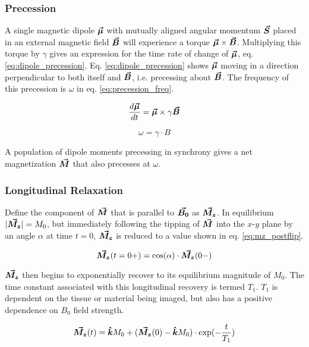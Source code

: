 \subsubsection{Precession}
A single magnetic dipole $\bm{\vec{\mu}}$ with mutually aligned angular momentum $\bm{\vec{S}}$ placed in an external magnetic
field $\bm{\vec{B}}$ will experience a torque $\bm{\vec{\mu}} \times \bm{\vec{B}}$. Multiplying this torque by $\gamma$ gives an
expression for the time rate of change of $\bm{\vec{\mu}}$, eq. \ref{eq:dipole_precession}. Eq. \ref{eq:dipole_precession}
shows $\bm{\vec{\mu}}$ moving in a direction perpendicular to both itself and $\bm{\vec{B}}$, i.e. precessing about $\bm{\vec{B}}$.
The frequency of this precession is $\omega$ in eq. \ref{eq:precession_freq}.

\begin{equation}\label{eq:dipole_precession}
    \frac{d \bm{\vec{\mu}}}{dt} = \bm{\vec{\mu}} \times \gamma \bm{\vec{B}}
\end{equation}

\begin{equation}\label{eq:precession_freq}
    \omega = \gamma \cdot B
\end{equation}

A population of dipole moments precessing in synchrony gives a net magnetization $\bm{\vec{M}}$ that also precesses at $\omega$.

\subsubsection{Longitudinal Relaxation}
Define the component of $\bm{\vec{M}}$ that is parallel to $\bm{\vec{B_0}}$ as $\bm{\vec{M_z}}$. In equilibrium $|\bm{\vec{M_z}}| =
M_0$, but immediately following the tipping of $\bm{\vec{M}}$ into the $x$-$y$ plane by an angle $\alpha$ at time $t=0$,
$\bm{\vec{M_z}}$ is reduced to a value shown in eq. \ref{eq:mz_postflip}.

\begin{equation}\label{eq:mz_postflip}
    \bm{\vec{M_z}}(t=0+) = \cos(\alpha) \cdot \bm{\vec{M_z}}(0-)
\end{equation}

$\bm{\vec{M_z}}$ then begins to exponentially recover to its equilibrium magnitude of $M_0$. The time constant associated
with this longitudinal recovery is termed $T_1$. $T_1$ is dependent on the tissue or material being imaged, but also has
a positive dependence on $B_0$ field strength.

\begin{equation}\label{eq:t1_decay}
    \bm{\vec{M_{z}}}(t) = \bm{\hat{k}} M_0 + (\bm{\vec{M_{z}}}(0) - \bm{\hat{k}} M_0) \cdot \exp(-\frac{t}{T_1})
\end{equation}

